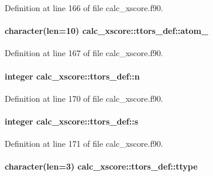 Definition at line 166 of file calc\-\_\-xscore.\-f90.

\hypertarget{structcalc__xscore_1_1ttors__def_a49ee3badc67b5c358b99a9ce14c79929}{
\paragraph[{atom\-\_\-4}]{\setlength{\rightskip}{0pt plus 5cm}character(len=10) calc\-\_\-xscore\-::ttors\-\_\-def\-::atom\-\_}}\label{structcalc__xscore_1_1ttors__def_a49ee3badc67b5c358b99a9ce14c79929}


Definition at line 167 of file calc\-\_\-xscore.\-f90.

\hypertarget{structcalc__xscore_1_1ttors__def_a855957d6f039ce5dc0a2fcfef5ad7083}{
\paragraph[{n}]{\setlength{\rightskip}{0pt plus 5cm}integer calc\-\_\-xscore\-::ttors\-\_\-def\-::n}}\label{structcalc__xscore_1_1ttors__def_a855957d6f039ce5dc0a2fcfef5ad7083}


Definition at line 170 of file calc\-\_\-xscore.\-f90.

\hypertarget{structcalc__xscore_1_1ttors__def_a1954924797843071d592b35c684200f8}{
\paragraph[{s}]{\setlength{\rightskip}{0pt plus 5cm}integer calc\-\_\-xscore\-::ttors\-\_\-def\-::s}}\label{structcalc__xscore_1_1ttors__def_a1954924797843071d592b35c684200f8}


Definition at line 171 of file calc\-\_\-xscore.\-f90.

\hypertarget{structcalc__xscore_1_1ttors__def_a89c4c8ab426a69d9bdf27787d52a4b03}{
\paragraph[{ttype}]{\setlength{\rightskip}{0pt plus 5cm}character(len=3) calc\-\_\-xscore\-::ttors\-\_\-def\-::ttype}}\label{structcalc__xscore_1_1ttors__def_a89c4c8ab426a69d9bdf27787d52a4b03}


